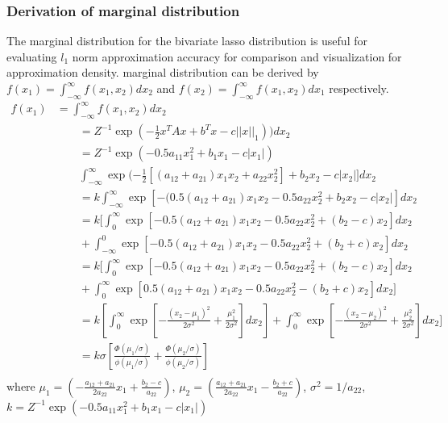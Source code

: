 \subsubsection{Derivation of marginal distribution}
The marginal distribution for the bivariate lasso distribution is useful for evaluating $l_1$ norm approximation accuracy for comparison and visualization for approximation density. marginal distribution can be derived by $f(x_1)
=  \int_{-\infty}^{\infty} f(x_1,x_2)dx_2 $ and $	f(x_2) =  \int_{-\infty}^{\infty} f(x_1,x_2)dx_1 $ respectively.
$$
\begin{array}{rl}
	f(x_1)
	& =  \int_{-\infty}^{\infty} f(x_1,x_2)dx_2 \\
	& \qquad
	= Z^{-1}\exp(-\frac{1}{2}x^TAx + b^Tx - c||x||_1))dx_2 \\
	& \qquad
	= Z^{-1}\exp(-0.5a_{11}x_1^2  + b_1x_1 - c|x_1|) \\
	& \qquad
	\int_{-\infty}^{\infty}\exp(-\frac{1}{2} [(a_{12}+a_{21})x_1x_2 + a_{22}x_2^2] + b_2x_2 - c|x_2|]dx_2\\
	& \qquad
	= k \int_{-\infty}^{\infty} \exp[-(0.5(a_{12}+a_{21})x_1x_2 -0.5a_{22}x_2^2 + b_2x_2 - c|x_2|]dx_2\\
	& \qquad
	= k[ \int_{0}^{\infty} \exp[-0.5(a_{12}+a_{21})x_1x_2 - 0.5a_{22}x_2^2 + (b_2 - c)x_2 ]dx_2  \\
	& \qquad
	+\int_{-\infty}^{0} \exp[-0.5(a_{12}+a_{21})x_1x_2  - 0.5a_{22}x_2^2  + (b_2+c)x_2]dx_2 \\
	& \qquad
	= k[ \int_{0}^{\infty} \exp[-0.5(a_{12}+a_{21})x_1x_2 - 0.5a_{22}x_2^2 + (b_2 - c)x_2 ]dx_2  \\
	& \qquad
	+\int_{0}^{\infty} \exp[0.5(a_{12}+a_{21})x_1x_2  - 0.5a_{22}x_2^2  - (b_2+ c)x_2]dx_2 ]\\
	& \qquad
	= k[\int_{0}^{\infty} \exp[-\frac{(x_2-\mu_1)^2}{2\sigma^2} + \frac{\mu_1^2}{2\sigma^2}]dx_2] + \int_{0}^{\infty} \exp[-\frac{(x_2-\mu_2)^2}{2\sigma^2} + \frac{\mu_2^2}{2\sigma^2}]dx_2] \\
	& \qquad
	= k \sigma[\frac{\Phi(\mu_1/\sigma)}{\phi(\mu_1/\sigma)} +
	\frac{\Phi(\mu_2/\sigma)}{\phi(\mu_2/\sigma)}]  \\
	
\end{array}
$$
where $\mu_1 = (-\frac{a_{12}+a_{21}}{2a_{22}}x_1 + \frac{b_2-c}{a_{22}}) $, $\mu_2 =(\frac{a_{12}+a_{21}}{2a_{22}}x_1 - \frac{b_2+c}{a_{22}}) $, $\sigma^2 = 1/a_{22}$, $k =  Z^{-1}\exp(-0.5a_{11}x_1^2 + b_1x_1 - c|x_1|)$

